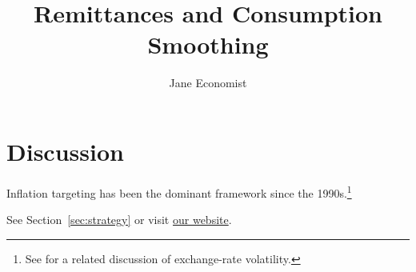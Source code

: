 \documentclass[11pt,a4paper]{article}
\title{Remittances and Consumption Smoothing}
\author{Jane Economist}
\begin{document}
\maketitle

\tableofcontents





\section{Discussion}

Inflation targeting has been the dominant framework
since the 1990s.\footnote{See \citet{nandi2024crude}
for a related discussion of exchange-rate volatility.}

See Section~\ref{sec:strategy} or visit
\href{https://whiteglobeinitiative.org}{our website}.


\end{document}
